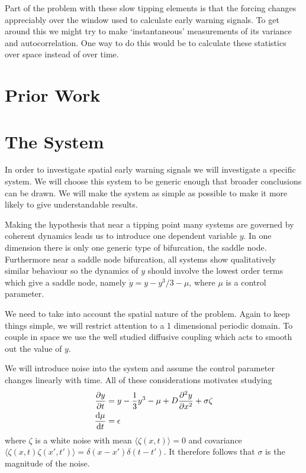 Part of the problem with these slow tipping elements is that the forcing changes appreciably over the window used to calculate early warning signals.
To get around this we might try to make `instantaneous' measurements of its variance and autocorrelation. One way to do this would be to calculate these
statistics over space instead of over time.

\section{Prior Work}

\section{The System}
In order to investigate spatial early warning signals we will investigate a specific system. We will choose this system
to be generic enough that broader conclusions can be drawn. We will make the system as simple as possible to make it more
likely to give understandable results.

Making the hypothesis that near a tipping point many systems are governed by coherent dynamics leads us to introduce one dependent
variable $y$. In one dimension there is only one generic type of bifurcation\cite{Thompson1994}, the saddle node. Furthermore
near a saddle node bifurcation, all systems show qualitatively similar behaviour\cite{guckenheimer2013} so the dynamics of $y$ should
involve the lowest order terms which give a saddle node, namely $\dot{y} = y - y^3/3 - \mu$, where $\mu$ is a control parameter.

We need to take into account the spatial nature of the problem. Again to keep things simple, we will restrict attention to a 1 dimensional
periodic domain. To couple in space we use the well studied diffusive coupling which acts to smooth out the value of $y$.

We will introduce noise into the system and assume the control parameter changes linearly with time. All of these considerations motivates studying
\begin{subequations}
\label{eq:spatial_system}
  \begin{align}
    \pdv{y}{t} &= y - \frac{1}{3}y^3 - \mu + D\pdv[2]{y}{x} + \sigma\zeta \label{eq:spatial_system_y} \\
    \dv{\mu}{t}&= \epsilon \label{eq:spatial_system_mu}
  \end{align}
\end{subequations}
where $\zeta$ is a white noise with mean $\langle \zeta(x,t) \rangle = 0$ and covariance $\langle \zeta(x,t)\zeta(x',t')\rangle = \delta(x-x')\delta(t-t')$.
It therefore follows that $\sigma$ is the magnitude of the noise.


